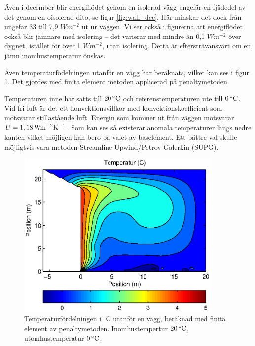 Även i december blir energiflödet genom en isolerad vägg ungefär en fjädedel av det 
genom en oisolerad dito, se figur \ref{fig:wall_dec}. Här minskar det dock från ungefär 33 
till 7,9 $\unit{W m^{-2}}$ ut ur väggen. Vi ser också i figurerna att energiflödet också blir 
jämnare med isolering – det varierar med mindre än 0,1 $\unit{W m^{-2}}$ över dygnet, 
istället för över 1 $\unit{W m^{-2}}$, utan isolering. Detta är eftersträvansvärt om en jämn inomhustemperatur önskas.


Även temperaturfödelningen utanför en vägg har beräknats, vilket kan ses i figur \ref{fig:temp_dist}. Det gjordes med finita element metoden applicerad på penaltymetoden.

Temperaturen inne har satts till $\unit[20]{^\circ C}$ och referenstemperaturen ute till 
$\unit[0]{^\circ C}$. Vid fri luft är det ett konvektionsvillkor med konvektionskoefficient 
som motsvarar stillastående luft. Energin som kommer ut från väggen motsvarar 
$U = \unit[1,18]{Wm^{-2}K^{-1}}$. Som kan ses så existerar anomala temperaturer längs 
nedre kanten vilket möjligen kan bero på valet av baselement. Ett bättre val skulle möjligtvis vara metoden Streamline-Upwind/Petrov-Galerkin (SUPG).


\begin{figure}[hpbt]
\centering
\includegraphics[width=10cm]{images/convectemperature.eps}
\caption{\label{fig:temp_dist}Temperaturfördelningen i $^\circ\mbox{C}$ utanför en vägg, beräknad med finita element av penaltymetoden. Inomhustempertur $\unit[20]{^\circ C}$, utomhustemperatur $\unit[0]{^\circ C}$.}
\end{figure}

